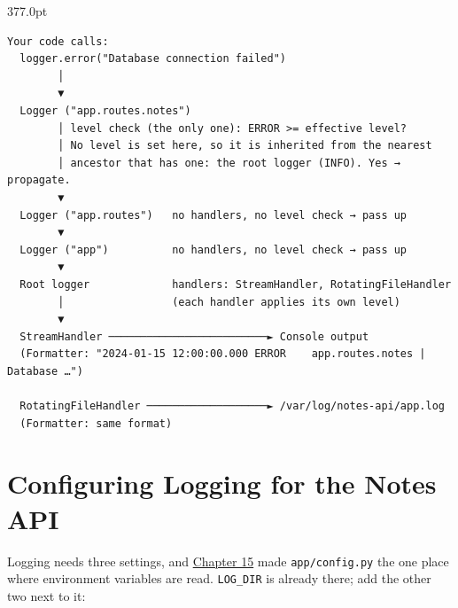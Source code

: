 \begin{diagrambox}[short]{377.0pt}
\begin{Verbatim}[fontsize=\fontsize{9.0}{8.55}\selectfont]
Your code calls:
  logger.error("Database connection failed")
        │
        ▼
  Logger ("app.routes.notes")
        │ level check (the only one): ERROR >= effective level?
        │ No level is set here, so it is inherited from the nearest
        │ ancestor that has one: the root logger (INFO). Yes → propagate.
        ▼
  Logger ("app.routes")   no handlers, no level check → pass up
        ▼
  Logger ("app")          no handlers, no level check → pass up
        ▼
  Root logger             handlers: StreamHandler, RotatingFileHandler
        │                 (each handler applies its own level)
        ▼
  StreamHandler ─────────────────────────► Console output
  (Formatter: "2024-01-15 12:00:00.000 ERROR    app.routes.notes | Database …")

  RotatingFileHandler ───────────────────► /var/log/notes-api/app.log
  (Formatter: same format)
\end{Verbatim}
\end{diagrambox}

\setcounter{section}{2}
\section{Configuring Logging for the Notes API}\label{16-logging-error-handling:163-configuring-logging-for-the-notes-api}

Logging needs three settings, and \hyperref[ch:15-structuring-the-application]{Chapter 15} made \texttt{app/config.py} the one place where environment variables are read. \texttt{LOG\_DIR} is already there; add the other two next to it:

\begin{codebox}[short]

\begin{Shaded}
\begin{Highlighting}[]
 \OperatorTok{=}\NormalTok{, }\NormalTok{)}
 \OperatorTok{=}\NormalTok{, }
\end{Highlighting}
\end{Shaded}

\end{codebox}

